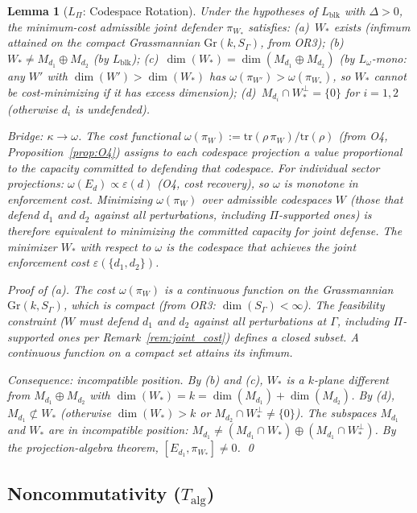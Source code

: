 \documentclass[11pt,a4paper]{article}
\newtheorem{lemma}[theorem]{Lemma}
\theoremstyle{definition}
\newcommand{\eps}{\varepsilon}
\newcommand{\tr}{\mathrm{tr}}
\newcommand{\Gr}{\mathrm{Gr}}
\begin{document}
\begin{lemma}[$L_\Pi$: Codespace Rotation]\label{lem:LPi}
Under the hypotheses of $L_{\mathrm{blk}}$ with $\Delta > 0$, the minimum-cost admissible joint defender $\pi_{W_*}$ satisfies: (a)~$W_*$ exists (infimum attained on the compact Grassmannian $\Gr(k, S_\Gamma)$, from OR3); (b)~$W_* \ne M_{d_1} \oplus M_{d_2}$ (by $L_{\mathrm{blk}}$); (c)~$\dim(W_*) = \dim(M_{d_1} \oplus M_{d_2})$ (by $L_\omega$-mono: any $W'$ with $\dim(W') > \dim(W_*)$ has $\omega(\pi_{W'}) > \omega(\pi_{W_*})$, so $W_*$ cannot be cost-minimizing if it has excess dimension); (d)~$M_{d_i} \cap W_*^\perp = \{0\}$ for $i = 1,2$ (otherwise $d_i$ is undefended).

\smallskip\noindent\textit{Bridge: $\kappa \to \omega$.}  The cost functional $\omega(\pi_W) := \tr(\rho\,\pi_W)/\tr(\rho)$ (from O4, Proposition~\ref{prop:O4}) assigns to each codespace projection a value proportional to the capacity committed to defending that codespace.  For individual sector projections: $\omega(E_d) \propto \eps(d)$ (O4, cost recovery), so $\omega$ is monotone in enforcement cost.  Minimizing $\omega(\pi_W)$ over admissible codespaces $W$ (those that defend $d_1$ and $d_2$ against all perturbations, including $\Pi$-supported ones) is therefore equivalent to minimizing the committed capacity for joint defense.  The minimizer $W_*$ with respect to $\omega$ is the codespace that achieves the joint enforcement cost $\eps(\{d_1, d_2\})$.

\noindent\textit{Proof of (a).}  The cost $\omega(\pi_W)$ is a continuous function on the Grassmannian $\Gr(k, S_\Gamma)$, which is compact (from OR3: $\dim(S_\Gamma) < \infty$).  The feasibility constraint ($W$ must defend $d_1$ and $d_2$ against all perturbations at $\Gamma$, including $\Pi$-supported ones per Remark~\ref{rem:joint_cost}) defines a closed subset.  A continuous function on a compact set attains its infimum.

\noindent\textit{Consequence: incompatible position.}  By (b) and (c), $W_*$ is a $k$-plane different from $M_{d_1} \oplus M_{d_2}$ with $\dim(W_*) = k = \dim(M_{d_1}) + \dim(M_{d_2})$.  By (d), $M_{d_1} \not\subset W_*$ (otherwise $\dim(W_*) > k$ or $M_{d_2} \cap W_*^\perp \ne \{0\}$).  The subspaces $M_{d_1}$ and $W_*$ are in \emph{incompatible position}: $M_{d_1} \ne (M_{d_1} \cap W_*) \oplus (M_{d_1} \cap W_*^\perp)$.  By the projection-algebra theorem, $[E_{d_1}, \pi_{W_*}] \ne 0$.  \qed
\end{lemma}

\subsection{Noncommutativity ($T_{\mathrm{alg}}$)}
\end{document}
